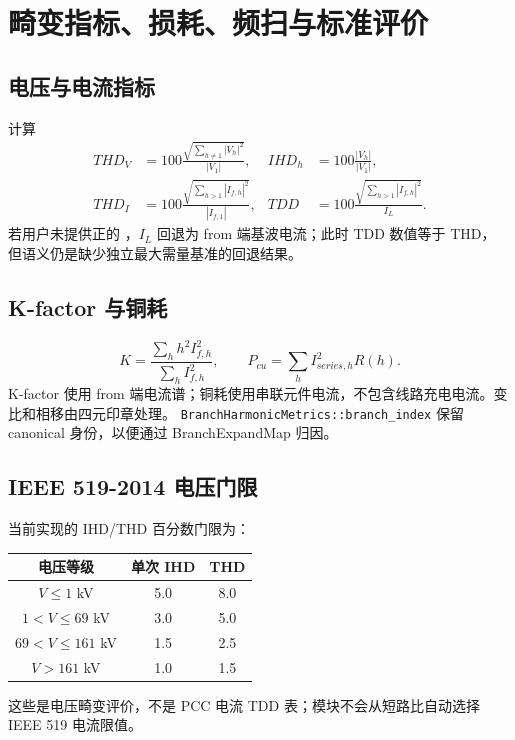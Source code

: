 \section{畸变指标、损耗、频扫与标准评价}
\subsection{电压与电流指标}
 计算
\begin{align}
THD_V&=100\frac{\sqrt{\sum_{h\ne1}|V_h|^2}}{|V_1|},&
IHD_h&=100\frac{|V_h|}{|V_1|},\\
THD_I&=100\frac{\sqrt{\sum_{h>1}|I_{f,h}|^2}}{|I_{f,1}|},&
TDD&=100\frac{\sqrt{\sum_{h>1}|I_{f,h}|^2}}{I_L}.
\end{align}
若用户未提供正的 ，$I_L$ 回退为 from 端基波电流；此时 TDD 数值等于 THD，
但语义仍是缺少独立最大需量基准的回退结果。

\subsection{K-factor 与铜耗}
\begin{equation}
K=\frac{\sum_hh^2I_{f,h}^2}{\sum_hI_{f,h}^2},\qquad
P_{cu}=\sum_h I_{series,h}^2R(h).
\end{equation}
K-factor 使用 from 端电流谱；铜耗使用串联元件电流，不包含线路充电电流。变比和相移由四元印章处理。
\texttt{BranchHarmonicMetrics::branch\_index} 保留 canonical 身份，以便通过 BranchExpandMap 归因。

\subsection{IEEE 519-2014 电压门限}
 当前实现的 IHD/THD 百分数门限为：
\begin{center}\footnotesize
\begin{tabular}{@{}ccc@{}}\toprule 电压等级 & 单次 IHD & THD\\ \midrule
$V\le1$ kV & 5.0 & 8.0\\
$1<V\le69$ kV & 3.0 & 5.0\\
$69<V\le161$ kV & 1.5 & 2.5\\
$V>161$ kV & 1.0 & 1.5\\ \bottomrule
\end{tabular}
\end{center}
这些是电压畸变评价，不是 PCC 电流 TDD 表；模块不会从短路比自动选择 IEEE 519 电流限值。

